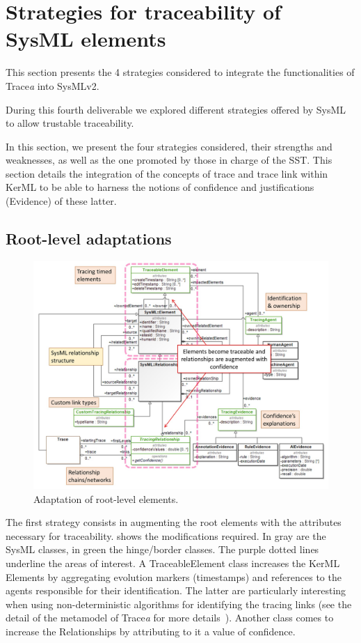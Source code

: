 \section{Strategies for traceability of SysML elements}\label{sec:strategies}
This section presents the 4 strategies considered to integrate the functionalities of Trace\textit{a} into SysMLv2.
\sideboxend

During this fourth deliverable we explored  different strategies offered by SysML to allow trustable traceability.

In this section, we present the four strategies considered, their strengths and weaknesses, as well as the one promoted by those in charge of the SST.
This section details the integration of the concepts of trace and trace link within KerML to be able to harness the notions of confidence and justifications (Evidence) of these latter. 
 
\subsection{Root-level adaptations}
\begin{figure}[h]     
	\centering
	\includegraphics[width=.95\linewidth]{images/strategy1-root.jpg}
	\caption{Adaptation of root-level elements. }
	\label{fig:strategy1}
\end{figure}
The first strategy consists in augmenting the root elements with the attributes necessary for traceability.  shows the modifications required. In gray are the SysML classes, in green the hinge/border classes. The purple dotted lines underline the areas of interest. A TraceableElement class increases the {KerML} Elements by aggregating evolution markers (timestamps) and references to the agents responsible for their identification. The latter are particularly interesting when using non-deterministic algorithms for identifying the tracing links (see the detail of the metamodel of Trace\textit{a} for more details~\cite{batot2021-not-another-metamodel}).
Another class comes to increase the Relationships by attributing to it a value of confidence.


